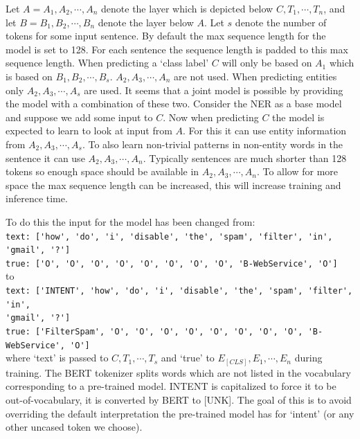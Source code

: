 Let $A = A_1, A_2, \cdots, A_n$ denote the layer which is depicted below $C, T_1, \cdots, T_n$, and let $B = B_1, B_2, \cdots, B_n$ denote the layer below $A$.
Let $s$ denote the number of tokens for some input sentence.
By default the max sequence length for the model is set to 128.
For each sentence the sequence length is padded to this max sequence length.
When predicting a `class label' $C$ will only be based on $A_1$ which is based on $B_1, B_2, \cdots, B_s$.
$A_2, A_3, \cdots, A_n$ are not used.
When predicting entities only $A_2, A_3, \cdots, A_s$ are used.
It seems that a joint model is possible by providing the model with a combination of these two.
Consider the NER as a base model and suppose we add some input to $C$.
Now when predicting $C$ the model is expected to learn to look at input from $A$.
For this it can use entity information from $A_2, A_3, \cdots, A_s$.
To also learn non-trivial patterns in non-entity words in the sentence it can use $A_2, A_3, \cdots, A_n$.
Typically sentences are much shorter than 128 tokens so enough space should be available in $A_2, A_3, \cdots, A_n$.
To allow for more space the max sequence length can be increased, this will increase training and inference time.

To do this the input for the model has been changed from: \\

\noindent \verb|text: ['how', 'do', 'i', 'disable', 'the', 'spam', 'filter', 'in', 'gmail', '?']|\\
\verb|true: ['O', 'O', 'O', 'O', 'O', 'O', 'O', 'O', 'B-WebService', 'O']|\\

to\\

\noindent \verb|text: ['INTENT', 'how', 'do', 'i', 'disable', 'the', 'spam', 'filter', 'in',|\\
\hspace*{12cm} \verb|'gmail', '?']|\\
\verb|true: ['FilterSpam', 'O', 'O', 'O', 'O', 'O', 'O', 'O', 'O', 'B-WebService', 'O']|\\

where `text' is passed to $C, T_1, \cdots, T_s$ and `true' to $E_{[CLS]}, E_1, \cdots, E_n$ during training.
The BERT tokenizer splits words which are not listed in the vocabulary corresponding to a pre-trained model.
INTENT is capitalized to force it to be out-of-vocabulary, it is converted by BERT to [UNK].
The goal of this is to avoid overriding the default interpretation the pre-trained model has for `intent' (or any other uncased token we choose).

